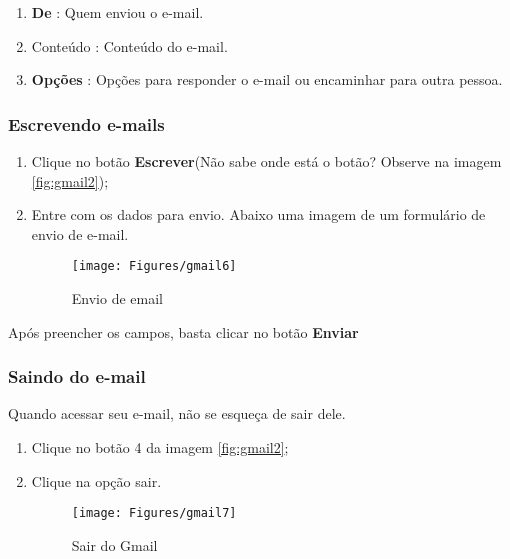 \documentclass[hidelinks,12pt]{article}
\begin{document}
		\begin{enumerate}
			\item \textbf{De} : Quem enviou o e-mail.

			\item Conteúdo : Conteúdo do e-mail.
			
			\item \textbf{Opções} : Opções para responder o e-mail ou encaminhar para outra pessoa.	
		\end{enumerate}
		
		\subsubsection{Escrevendo e-mails}
		
		\begin{enumerate}
			\item Clique no botão \textbf{Escrever}(Não sabe onde está o botão? Observe na imagem \ref{fig:gmail2});
			\item Entre com os dados para envio. Abaixo uma imagem de um formulário de envio de e-mail.
			
			\begin{figure}[!h]
				\centering
				\texttt{[image: Figures/gmail6]}
				\label{fig:gmail6}
				\caption{Envio de email}
			\end{figure}
						
		\end{enumerate}
		Após preencher os campos, basta clicar no botão \textbf{Enviar}
		
		\subsubsection{Saindo do e-mail}
		
		Quando acessar seu e-mail, não se esqueça de sair dele.
		
		\begin{enumerate}
			\item Clique no botão 4 da imagem \ref{fig:gmail2};
			
			\item Clique na opção sair.
			
			\begin{figure}[!h]
				\centering
				\texttt{[image: Figures/gmail7]}
				\label{fig:gmail7}
				\caption{Sair do Gmail}
			\end{figure}
			
		\end{enumerate}
	
\end{document}
